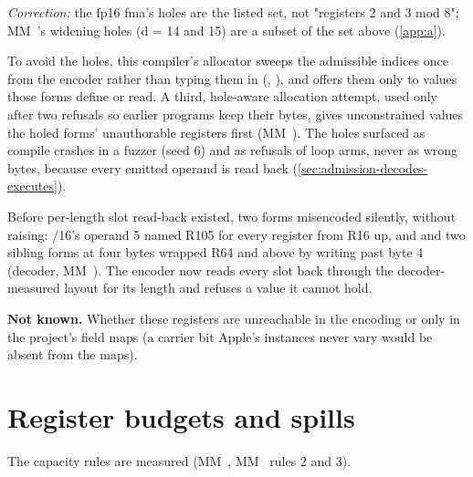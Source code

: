 \emph{Correction:} the fp16 fma's holes are the listed set, not "registers 2 and 3 mod 8"; MM~'s widening holes
(d = 14 and 15) are a subset of the set above (\cref{app:a}).

To avoid the holes, this compiler's allocator sweeps the admissible indices once from the encoder rather than typing them in
(, ), and offers them only to values those forms define or read. A third,
hole-aware allocation attempt, used only after two refusals so earlier programs keep their bytes, gives unconstrained
values the holed forms' unauthorable registers first (MM~). The holes surfaced as compile crashes in a fuzzer
(seed 6) and as refusals of loop arms, never as wrong bytes, because every emitted operand is read back (\cref{sec:admission-decodes-executes}).

Before per-length slot read-back existed, two forms misencoded silently, without raising:
/16's operand 5 named R105 for every register from R16 up, and  and two sibling forms at four bytes wrapped R64 and above by writing past byte 4 (decoder, MM~). The
encoder now reads every slot back through the decoder-measured layout for its length and refuses a value it cannot hold.

\textbf{Not known.} Whether these registers are unreachable in the encoding or only in the project's field maps (a carrier
bit Apple's instances never vary would be absent from the maps).

\section{Register budgets and spills}\label{sec:capacity-budgets-spills}

The capacity rules are measured (MM~, MM~ rules 2 and 3).

